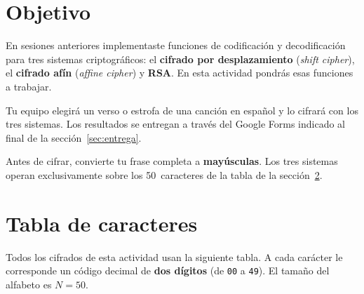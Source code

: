 \documentclass[12pt, oneside]{article}
\begin{document}

\tableofcontents
\newpage

\section{Objetivo}

En sesiones anteriores implementaste funciones de codificación y
decodificación para tres sistemas criptográficos: el \textbf{cifrado
por desplazamiento} (\textit{shift cipher}), el \textbf{cifrado afín}
(\textit{affine cipher}) y \textbf{RSA}.  En esta actividad pondrás
esas funciones a trabajar.

Tu equipo elegirá un verso o estrofa de una canción en español y lo
cifrará con los tres sistemas.  Los resultados se entregan a través
del Google Forms indicado al final de la sección~\ref{sec:entrega}.

\begin{recuerda}
  Antes de cifrar, convierte tu frase completa a \textbf{mayúsculas}.
  Los tres sistemas operan exclusivamente sobre los 50~caracteres de
  la tabla de la sección~\ref{sec:tabla}.
\end{recuerda}

\newpage
\section{Tabla de caracteres}
\label{sec:tabla}

Todos los cifrados de esta actividad usan la siguiente tabla.  A cada
carácter le corresponde un código decimal de \textbf{dos dígitos}
(de \texttt{00} a \texttt{49}).  El tamaño del alfabeto es $N = 50$.
\end{document}
